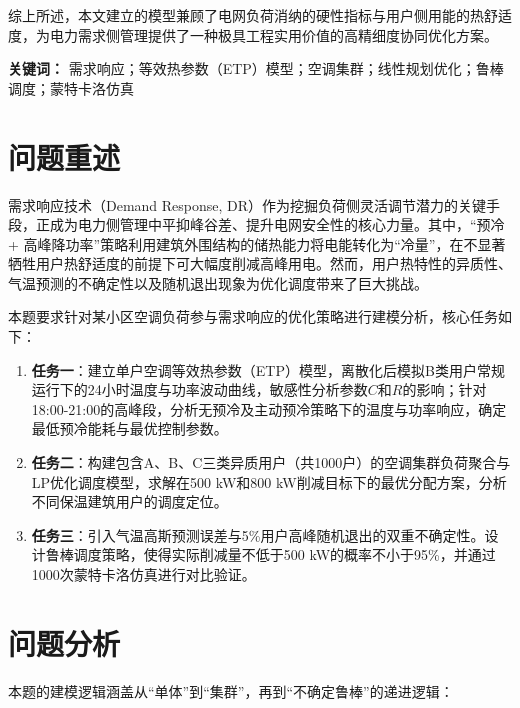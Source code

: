 \documentclass[12pt,a4paper]{article}
\begin{document}
综上所述，本文建立的模型兼顾了电网负荷消纳的硬性指标与用户侧用能的热舒适度，为电力需求侧管理提供了一种极具工程实用价值的高精细度协同优化方案。

\textbf{关键词：} 需求响应；等效热参数（ETP）模型；空调集群；线性规划优化；鲁棒调度；蒙特卡洛仿真

\clearpage

\section{问题重述}
需求响应技术（Demand Response, DR）作为挖掘负荷侧灵活调节潜力的关键手段，正成为电力侧管理中平抑峰谷差、提升电网安全性的核心力量。其中，“预冷 + 高峰降功率”策略利用建筑外围结构的储热能力将电能转化为“冷量”，在不显著牺牲用户热舒适度的前提下可大幅度削减高峰用电。然而，用户热特性的异质性、气温预测的不确定性以及随机退出现象为优化调度带来了巨大挑战。

本题要求针对某小区空调负荷参与需求响应的优化策略进行建模分析，核心任务如下：
\begin{enumerate}
    \item \textbf{任务一}：建立单户空调等效热参数（ETP）模型，离散化后模拟B类用户常规运行下的24小时温度与功率波动曲线，敏感性分析参数$C$和$R$的影响；针对18:00-21:00的高峰段，分析无预冷及主动预冷策略下的温度与功率响应，确定最低预冷能耗与最优控制参数。
    \item \textbf{任务二}：构建包含A、B、C三类异质用户（共1000户）的空调集群负荷聚合与LP优化调度模型，求解在500 kW和800 kW削减目标下的最优分配方案，分析不同保温建筑用户的调度定位。
    \item \textbf{任务三}：引入气温高斯预测误差与5\%用户高峰随机退出的双重不确定性。设计鲁棒调度策略，使得实际削减量不低于500 kW的概率不小于95\%，并通过1000次蒙特卡洛仿真进行对比验证。
\end{enumerate}

\section{问题分析}
本题的建模逻辑涵盖从“单体”到“集群”，再到“不确定鲁棒”的递进逻辑：
\end{document}
